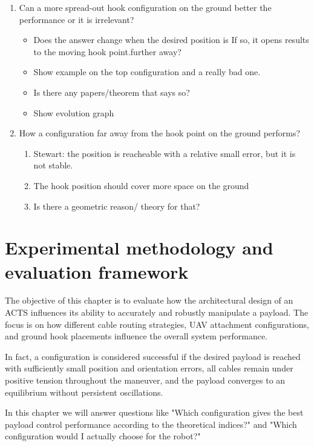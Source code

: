 \begin{enumerate}
\begin{itemize}
    \end{itemize}
    \item Can a more spread-out hook configuration on the ground better the performance or it is irrelevant? 
    \begin{itemize}
        \item Does the answer change when the desired position is If so, it opens results to the moving hook point.further away?
        \item Show example on the top configuration and a really bad one.
        \item Is there any papers/theorem that says so?
        \item Show evolution graph
    \end{itemize}  
    \item How a configuration far away from the hook point on the ground performs?
    \begin{enumerate}
        \item Stewart: the position is reacheable with a relative small error, but it is not stable.
        \item The hook position should cover more space on the ground
        \item Is there a geometric reason/ theory for that?
    \end{enumerate} 
\end{enumerate}

\newpage

\section{Experimental methodology and evaluation framework}

The objective of this chapter is to evaluate how the architectural design of an ACTS influences its ability to accurately and robustly manipulate a payload. The focus is on how different cable routing strategies, UAV attachment configurations, and ground hook placements influence the overall system performance.

In fact, a configuration is considered successful if the desired payload is reached with sufficiently small position and orientation errors, all cables remain under positive tension throughout the maneuver, and the payload converges to an equilibrium without persistent oscillations.

In this chapter we will answer questions like "Which configuration gives the best payload control performance according to the theoretical indices?" and "Which configuration would I actually choose for the robot?"

